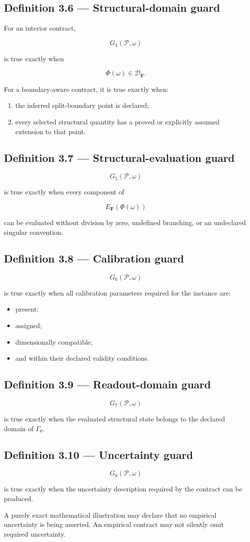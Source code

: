 \documentclass[11pt,oneside,openany]{book}
\newcommand{\PCsubsection}[1]{%
  \subsection*{#1}%
}
\begin{document}
\PCsubsection{Definition 3.6 --- Structural-domain guard}

For an interior contract,

\[
G_4(\mathcal P,\omega)
\]

is true exactly when

\[
\Phi(\omega)\in\mathcal D_{\mathbf F}.
\]

For a boundary-aware contract, it is true exactly when:

\begin{enumerate}
\item the inferred split-boundary point is declared;
\item every selected structural quantity has a proved or explicitly assumed extension to that point.
\end{enumerate}
\PCsubsection{Definition 3.7 --- Structural-evaluation guard}

\[
G_5(\mathcal P,\omega)
\]

is true exactly when every component of

\[
E_{\mathbf F}(\Phi(\omega))
\]

can be evaluated without division by zero, undefined branching, or an undeclared singular convention.

\PCsubsection{Definition 3.8 --- Calibration guard}

\[
G_6(\mathcal P,\omega)
\]

is true exactly when all calibration parameters required for the instance are:

\begin{itemize}
\item present;
\item assigned;
\item dimensionally compatible;
\item and within their declared validity conditions.
\end{itemize}
\PCsubsection{Definition 3.9 --- Readout-domain guard}

\[
G_7(\mathcal P,\omega)
\]

is true exactly when the evaluated structural state belongs to the declared domain of \(\Gamma_\theta\).

\PCsubsection{Definition 3.10 --- Uncertainty guard}

\[
G_8(\mathcal P,\omega)
\]

is true exactly when the uncertainty description required by the contract can be produced.

A purely exact mathematical illustration may declare that no empirical uncertainty is being asserted. An empirical contract may not silently omit required uncertainty.
\end{document}
